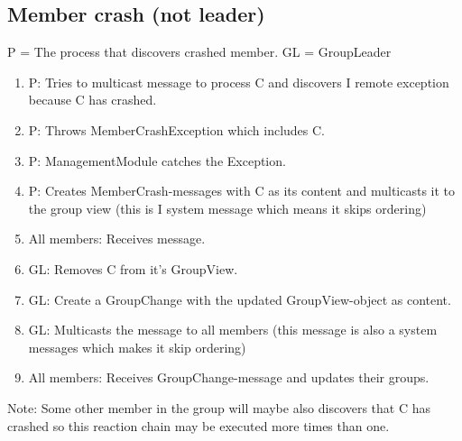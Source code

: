 \documentclass[titlepage, twocolumn, a4paper, 10pt]{article}
\begin{document}
\subsection{Member crash (not leader)}
P = The process that discovers crashed member. GL = GroupLeader
\begin{enumerate}
\item P: Tries to multicast message to process C and discovers I
  remote exception because C has crashed.
\item P: Throws MemberCrashException which includes C.
\item P: ManagementModule catches the Exception.
\item P: Creates MemberCrash-messages with C as its content and
  multicasts it to the group view (this is I system message which
  means it skips ordering)
\item All members: Receives message.
\item GL: Removes C from it’s GroupView.
\item GL: Create a GroupChange with the updated GroupView-object as content.
\item GL: Multicasts the message to all members (this message is also
  a system messages which makes it skip ordering)
\item All members: Receives GroupChange-message and updates their groups.
\end{enumerate}
Note: Some other member in the group will maybe also discovers that C
has crashed so this reaction chain may be executed more times than
one.
\end{document}
